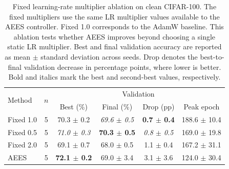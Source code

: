 \begin{table}[t]
\centering
\small
\setlength{\tabcolsep}{5pt}
\begin{tabular}{lccccc}
\toprule
\multirow{2}{*}{Method} & \multirow{2}{*}{$n$} & \multicolumn{4}{c}{Validation} \\
& & Best (\%) & Final (\%) & Drop (pp) & Peak epoch \\
\midrule
Fixed 1.0 & 5 & 70.3 $\pm$ 0.2 & \emph{69.6 $\pm$ 0.5} & \textbf{0.7 $\pm$ 0.4} & 188.6 $\pm$ 10.4 \\
Fixed 0.5 & 5 & \emph{71.0 $\pm$ 0.3} & \textbf{70.3 $\pm$ 0.5} & \emph{0.8 $\pm$ 0.5} & 169.0 $\pm$ 19.8 \\
Fixed 2.0 & 5 & 69.1 $\pm$ 0.7 & 68.0 $\pm$ 0.5 & 1.1 $\pm$ 0.4 & 167.2 $\pm$ 31.1 \\
AEES & 5 & \textbf{72.1 $\pm$ 0.2} & 69.0 $\pm$ 3.4 & 3.1 $\pm$ 3.6 & 124.0 $\pm$ 30.4 \\
\bottomrule
\end{tabular}
\caption{Fixed learning-rate multiplier ablation on clean CIFAR-100. The fixed multipliers use the same LR multiplier values available to the AEES controller. Fixed 1.0 corresponds to the AdamW baseline. This ablation tests whether AEES improves beyond choosing a single static LR multiplier. Best and final validation accuracy are reported as mean $\pm$ standard deviation across seeds. Drop denotes the best-to-final validation decrease in percentage points, where lower is better. Bold and italics mark the best and second-best values, respectively.}
\label{tab:cifar_clean_fixed_lr_ablation}
\end{table}
